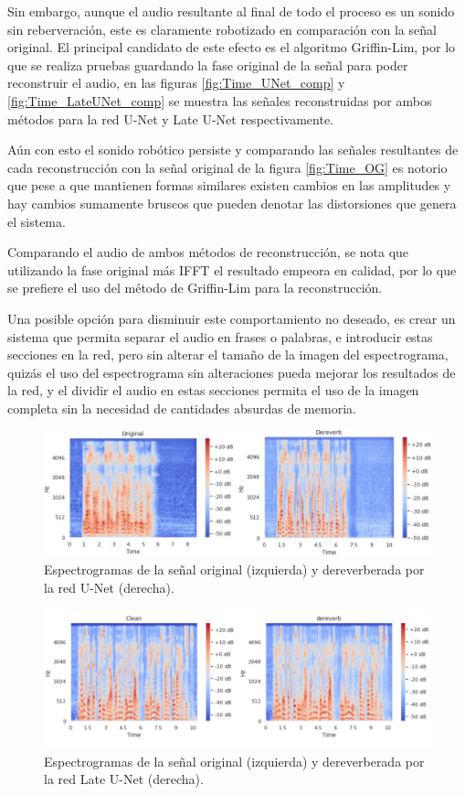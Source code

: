 Sin embargo, aunque el audio resultante al final de todo el proceso es un sonido sin reberveración, este es claramente robotizado en comparación con la señal original.
El principal candidato de este efecto es el algoritmo Griffin-Lim, por lo que se realiza pruebas guardando la fase original de la señal para poder reconstruir el audio, en las figuras \ref{fig:Time_UNet_comp} y \ref{fig:Time_LateUNet_comp} se muestra las señales reconstruidas por ambos métodos para la red U-Net y Late U-Net respectivamente.


Aún con esto el sonido robótico persiste y comparando las señales resultantes de cada reconstrucción con la señal original de la figura \ref{fig:Time_OG} es notorio que pese a que mantienen formas similares existen cambios en las amplitudes y hay cambios sumamente bruscos que pueden denotar las distorsiones que genera el sistema.

Comparando el audio de ambos métodos de reconstrucción, se nota que utilizando la fase original más IFFT el resultado empeora en calidad, por lo que se prefiere el uso del método de Griffin-Lim para la reconstrucción.

Una posible opción para disminuir este comportamiento no deseado, es crear un sistema que permita separar el audio en frases o palabras, e introducir estas secciones en la red, pero sin alterar el tamaño de la imagen del espectrograma, quizás el uso del espectrograma sin alteraciones pueda mejorar los resultados de la red, y el dividir el audio en estas secciones permita el uso de la imagen completa sin la necesidad de cantidades absurdas de memoria.


\begin{figure}
    \centering
    \includegraphics[scale=0.4]{img/Spect_resultados.png}
    \caption{Espectrogramas de la señal original (izquierda) y dereverberada por la red U-Net (derecha).}
    \label{fig:Spec_UNet_comp}
\end{figure}
\begin{figure}
    \centering
    \includegraphics[scale=0.55]{img/Comp_Spect_OG-LateUNet.PNG}
    \caption{Espectrogramas de la señal original (izquierda) y dereverberada por la red Late U-Net (derecha).}
    \label{fig:Spec_LateUNet_comp}
\end{figure}


